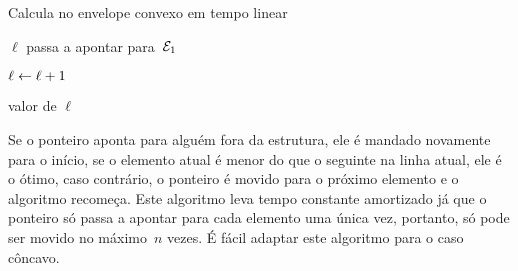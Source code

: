 \begin{algorithm}[h]
\caption{Calcula no envelope convexo em tempo linear}
\label{Online:envelope:linear}
\begin{algorithmic}[1]
        \State $\ell$ passa a apontar para~$\mathcal{E}_1$
    \EndIf
    
        \State $\ell \leftarrow \ell+1$
    \EndWhile

    \State \Return valor de $\ell$
\EndFunction
\end{algorithmic}
\end{algorithm}

Se o ponteiro aponta para alguém fora da estrutura, ele é mandado novamente para o início, se o elemento atual é menor do que o seguinte na linha atual, ele é o ótimo, caso contrário, o ponteiro é movido para o próximo elemento e o algoritmo recomeça. Este algoritmo leva tempo constante amortizado já que o ponteiro só passa a apontar para cada elemento uma única vez, portanto, só pode ser movido no máximo~$n$ vezes. É fácil adaptar este algoritmo para o caso côncavo.
